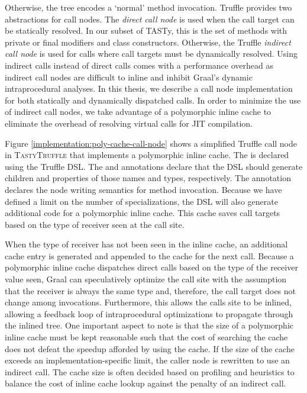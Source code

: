 Otherwise, the  tree encodes a `normal' method invocation.
Truffle provides two abstractions for call nodes.
The \textit{direct call node} is used when the call target can be statically resolved. 
In our subset of TASTy, this is the set of methods with private or final modifiers\cite{java:lang-spec} and class constructors. 
Otherwise, the Truffle \textit{indirect call node} is used for calls where call targets must be dynamically resolved. 
Using indirect calls instead of direct calls comes with a performance overhead as indirect call nodes are difficult to inline and inhibit Graal's dynamic intraprocedural analyses.
In this thesis, we describe a call node implementation for both statically and dynamically dispatched calls. 
In order to minimize the use of indirect call nodes, we take advantage of a polymorphic inline cache\cite{self:polymorphic-inline-caches} to eliminate the overhead of resolving virtual calls for JIT compilation. 

Figure \ref{implementation:poly-cache-call-node} shows a simplified Truffle call node in \textsc{TastyTruffle} that implements a polymorphic inline cache.
The  is declared using the Truffle DSL.
The  and  annotations declare that the DSL should generate children and properties of those names and types, respectively. 
The  annotation declares the node writing semantics for method invocation.
Because we have defined a limit on the number of specializations, the DSL will also generate additional code for a polymorphic inline cache.
This cache saves call targets based on the type of receiver seen at the call site. 

When the type of receiver has not been seen in the inline cache, an additional cache entry is generated and appended to the cache for the next call.
Because a polymorphic inline cache dispatches direct calls based on the type of the receiver value seen, Graal can speculatively optimize the call site with the assumption that the receiver is always the same type and, therefore, the call target does not change among invocations.
Furthermore, this allows the calls site to be inlined, allowing a feedback loop of intraprocedural optimizations\cite{conditional-constant-prop,variable-congruence} to propagate through the inlined tree.
One important aspect to note is that the size of a polymorphic inline cache must be kept reasonable such that the cost of searching the cache does not defeat the speedup afforded by using the cache.
If the size of the cache exceeds an implementation-specific limit, the caller node is rewritten to use an indirect call.
The cache size is often decided based on profiling and heuristics to balance the cost of inline cache lookup against the penalty of an indirect call. 

